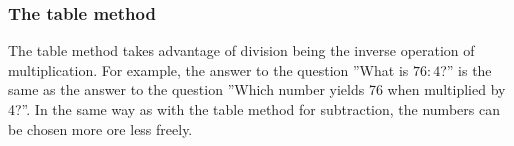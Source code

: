 \subsubsection{The table method}
The table method takes advantage of division being the inverse operation of multiplication. For example, the answer to the question ''What is $ {76:4} $?'' is the same as the answer to the question ''Which number yields 76 when multiplied by 4?''. In the same way as with the table method for subtraction, the numbers can be chosen more ore less freely.
\begin{center}
	\label{ekstbldiv}
	\parbox{0.35\linewidth}{
		} \qquad
\parbox{0.35\linewidth}{
	} \vsk

\parbox{0.415\linewidth}{
}
\end{center}
\newpage
